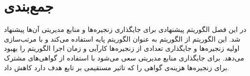 \section{جمع‌بندی}

در این فصل الگوریتم پیشنهادی برای جایگذاری زنجیره‌ها و منابع مدیریتی آن‌ها پیشنهاد شد.
این الگوریتم از الگوریتم \cite{Bari2015}
به عنوان الگوریتم پایه استفاده می‌کند و با مرتب‌سازی اولیه زنجیره‌ها
و جایگذاری 
تعدادی از زنجیره‌ها کارآیی و زمان اجرا الگوریتم را بهبود می‌دهد.
برای جایگذاری منابع مدیریتی سعی می‌شود با استفاده از گواهی‌های مشترک برای زنجیره‌ها
هزینه‌ی گواهی را که تاثیر مستقیمی بر تابع هدف دارد کاهش داد.